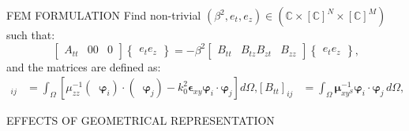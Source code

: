 \documentclass[final]{beamer} %
\def\\{ }%
\newcommand{\testhone}[0]{\varphi}
\DeclareMathOperator{\curlopt}{\nabla_t \times}
\DeclareMathOperator{\gradopt}{\nabla_t}
\begin{document}
\begin{frame}
\begin{columns}
\begin{column}{0.45\textwidth}
{        \vfill
        \begin{block}{\boxnumber FEM FORMULATION}
        Find non-trivial $\left(\beta^2,{e_t}, {e_z}\right) \in (\mathbb{C} \times [\mathbb{C}]^N \times [\mathbb{C}]^M)$ such that:
\begin{equation}\label{eq:fem-discretized-form}
  \begin{bmatrix}
    A_{tt} & 0 \\
    0      & 0
  \end{bmatrix}
  \begin{Bmatrix}
    e_t \\
    e_z
  \end{Bmatrix}
  = - \beta ^2
  \begin{bmatrix}
    B_{tt} & B_{tz} \\
    B_{zt} & B_{zz}
  \end{bmatrix}
  \begin{Bmatrix}
    e_t \\
    e_z
  \end{Bmatrix}
  \text{,}
\end{equation}
and the matrices are defined as:
\begin{align}
  [A_{tt}]_{ij} &= \int_{\Omega}
  \left[
  \mu_{zz}^{-1}\left( \curlopt \bm{\varphi}_i \right) \cdot
  \left( \curlopt \bm{\varphi}_j \right)
  - k_0^2 \bm{\epsilon}_{xy} \bm{\varphi}_i\cdot \bm{\varphi}_j\right] d\Omega\text{,}\label{eq:fem-mat-1}\\
  [B_{tt}]_{ij} &= \int_{\Omega}  \bm{\mu}_{xy^S}^{-1}\bm{\varphi}_i  \cdot
  \bm{\varphi}_j\, d\Omega\text{,}\label{eq:fem-mat-2}\\
  [B_{tz}]_{ij} &= \int_{\Omega}  \bm{\mu}_{xy^S}^{-1}\bm{\varphi}_i  \cdot
  \gradopt \testhone_j\, d\Omega\text{,}\label{eq:fem-mat-3}\\
  [B_{zt}]_{ij} &= \int_{\Omega}  \bm{\mu}_{xy^S}^{-1}\gradopt \testhone_i  \cdot
  \bm{\varphi}_j
  \, d\Omega\text{,}\label{eq:fem-mat-4}\\
  [B_{zz}]_{ij} &= \int_{\Omega}
  \left[
  \bm{\mu}_r^{-1}\gradopt \testhone_i  \cdot
  \gradopt \testhone_j
  - k_0^2 \epsilon_{zz} \testhone_i \testhone_j\right] d\Omega\text{.}\label{eq:fem-mat-5}
\end{align}
        \end{block}
        \begin{block}{\boxnumber EFFECTS OF GEOMETRICAL REPRESENTATION}
        \begin{figure}[ht]
            \centering

\end{figure}
\end{block}}
\end{column}
\end{columns}
\end{frame}
\end{document}
